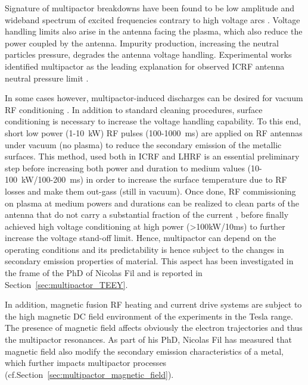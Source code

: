 
Signature of multipactor breakdowns have been found to be low amplitude and wideband spectrum of excited frequencies contrary to high voltage arcs . Voltage handling limits also arise in the antenna facing the plasma, which also reduce the power coupled by the antenna. Impurity production, increasing the neutral particles pressure, degrades the antenna voltage handling. Experimental works identified multipactor as the leading explanation for observed ICRF antenna neutral pressure limit .

In some cases however, multipactor-induced discharges can be desired for vacuum RF conditioning . In addition to standard cleaning procedures, surface conditioning is necessary to increase the voltage handling capability. To this end, short low power (1-10~kW) RF pulses (100-1000~ms) are applied on RF antennas under vacuum (no plasma) to reduce the secondary emission of the metallic surfaces. This method, used both in ICRF  and LHRF  is an essential preliminary step before increasing both power and duration to medium values (10-100~kW/100-200~ms) in order to increase the surface temperature due to RF losses and make them out-gass (still in vacuum). Once done, RF commissioning on plasma at medium powers and durations can be realized to clean parts of the antenna that do not carry a substantial fraction of the current , before finally achieved high voltage conditioning at high power (>100kW/10ms) to further increase the voltage stand-off limit. Hence, multipactor can depend on the operating conditions and its predictability is hence subject to the changes  in secondary emission properties of material. This aspect has been investigated in the frame of the PhD of Nicolas Fil and is reported in Section~\ref{sec:multipactor_TEEY}.

In addition, magnetic fusion RF heating and current drive systems are subject to the high magnetic DC field environment of the experiments in the Tesla range. The presence of magnetic field affects obviously the electron trajectories and thus the multipactor resonances. As part of his PhD, Nicolas Fil  has measured that magnetic field also modify the secondary emission characteristics of a metal, which further impacts multipactor processes (cf.Section~\ref{sec:multipactor_magnetic_field}). 

